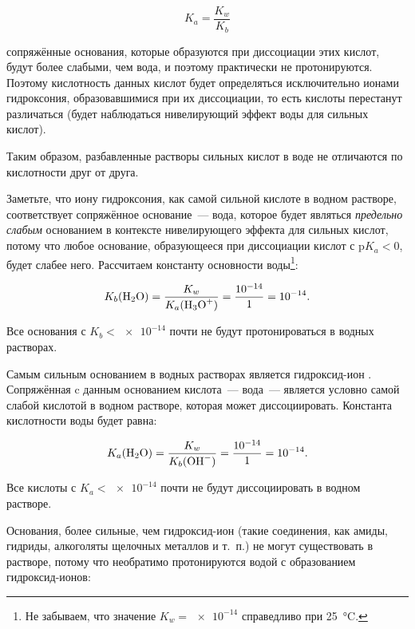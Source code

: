 \begin{equation*}
    K_a = \frac{K_w}{K_b}
\end{equation*}

сопряжённые основания, которые образуются при диссоциации этих кислот, будут более слабыми, чем вода, и поэтому практически не протонируются. Поэтому кислотность данных кислот будет определяться исключительно ионами гидроксония, образовавшимися при их диссоциации, то есть кислоты перестанут различаться (будет наблюдаться нивелирующий эффект воды для сильных кислот).

Таким образом, разбавленные растворы сильных кислот в воде не отличаются по кислотности друг от друга.

Заметьте, что иону гидроксония, как самой сильной кислоте в водном растворе, соответствует сопряжённое основание~--- вода, которое будет являться \emph{предельно слабым} основанием в контексте нивелирующего эффекта для сильных кислот, потому что любое основание, образующееся при диссоциации кислот с $\text{p}K_a < 0$, будет слабее него. Рассчитаем константу основности воды\footnote{Не забываем, что значение $K_w = \num{e-14}$ справедливо при \qty{25}{\degreeCelsius}.}:

\begin{equation*}
    K_b(\ce{H2O}) = \frac{K_w}{K_a(\ce{H3O^+})} = \frac{\num{e-14}}{1} = \num{e-14}.
\end{equation*}

Все основания с $K_b < \num{e-14}$ почти не будут протонироваться в водных растворах.

Самым сильным основанием в водных растворах является гидроксид-ион . Сопряжённая c данным основанием кислота~--- вода~--- является условно самой слабой кислотой в водном растворе, которая может диссоциировать. Константа кислотности воды будет равна:

\begin{equation*}
    K_a(\ce{H2O}) = \frac{K_w}{K_b(\ce{OH^-})} = \frac{\num{e-14}}{1} = \num{e-14}.
\end{equation*}

Все кислоты с $K_a < \num{e-14}$ почти не будут диссоциировать в водном растворе.

Основания, более сильные, чем гидроксид-ион (такие соединения, как амиды, гидриды, алкоголяты щелочных металлов и т.~п.) не могут существовать в растворе, потому что необратимо протонируются водой с образованием гидроксид-ионов:



